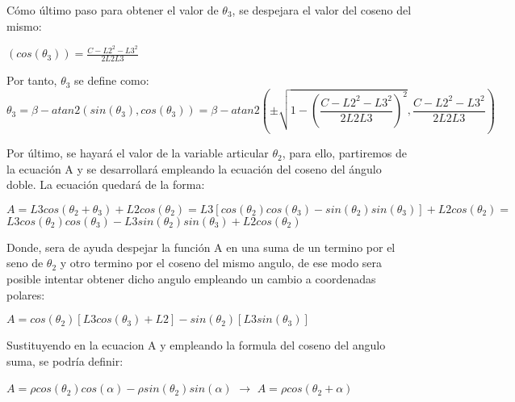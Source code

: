 	Cómo último paso para obtener el valor de $\theta_{3}$, se despejara el valor del coseno del mismo:\\
	\begin{center}
		$ (cos(\theta_{3})) = \frac{C-L2^{2}-L3^{2}}{2L2L3} $
	\end{center}
	Por tanto, $\theta_{3}$ se define como:\\
	\begin{equation}
	\theta_{3}=\beta -atan2(sin(\theta_{3}),cos(\theta_{3}))=\beta-atan2(\pm \sqrt{1-(\frac{C-L2^{2}-L3^{2}}{2L2L3})^{2}},\frac{C-L2^{2}-L3^{2}}{2L2L3} )
	\end{equation}
	
	\newpage
	Por último, se hayará el valor de la variable articular $\theta_{2}$, para ello, partiremos de la ecuación A y se desarrollará empleando la ecuación del coseno del ángulo doble. La ecuación quedará de la forma: \\
	\begin{center}
		$A=L3cos(\theta_{2}+\theta_{3})+L2cos(\theta_{2})=L3[cos(\theta_{2})cos(\theta_{3})-sin(\theta_{2})sin(\theta_{3})]+L2cos(\theta_{2})=$\\ \vspace{0.3cm} $L3cos(\theta_{2})cos(\theta_{3})-L3sin(\theta_{2})sin(\theta_{3})+L2cos(\theta_{2})$
	\end{center}
Donde, sera de ayuda despejar la función A en una suma de un termino por el seno de $ \theta_{2}$ y otro termino por el coseno del mismo angulo, de ese modo sera posible intentar obtener dicho angulo empleando un cambio a coordenadas polares:
	\begin{center}
		$A=cos(\theta_{2})[L3cos(\theta_{3})+L2]-sin(\theta_{2})[L3sin(\theta_{3})]$\\
		\vspace{0.3cm}
		\hfill
	\end{center}
	Sustituyendo en la ecuacion A  y empleando la formula del coseno del angulo suma, se podría definir:\\
	\begin{center}
	$A=\rho cos(\theta_{2})cos(\alpha)-\rho sin(\theta_{2})sin(\alpha)$ $\rightarrow$ $A=\rho cos(\theta_{2}+\alpha)$
	\end{center}
	
